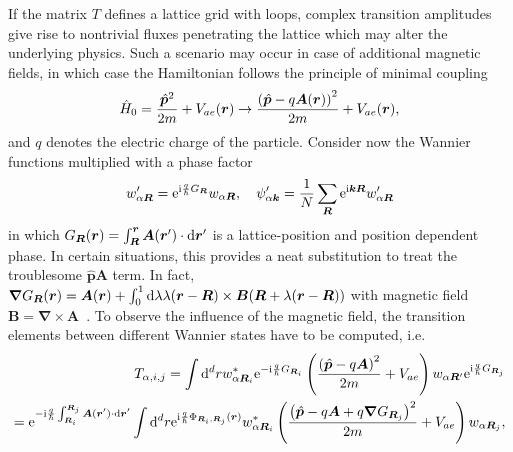 If the matrix $T$ defines a lattice grid with loops, complex transition amplitudes give rise to nontrivial fluxes penetrating the lattice which may alter the underlying physics.
Such a scenario may occur in case of additional magnetic fields, in which case the Hamiltonian follows the principle of minimal coupling
\begin{align}
    \hat H_0 = \frac{\hat{\bm p}^2}{2m}+V_{ae}(\bm r)\rightarrow \frac{\left( \hat{\bm p} - q\bm A(\bm r) \right)^2}{2m}+V_{ae}(\bm r),
\end{align}
and $q$ denotes the electric charge of the particle.
Consider now the Wannier functions multiplied with a phase factor
\begin{align}
    w'_{\alpha\bm R} = \mathrm e^{\mathrm i\frac q\hbar G_{\bm R}}w_{\alpha\bm R},
    \quad
    \psi'_{\alpha\bm k} = \frac1N\sum_{\bm R}\mathrm e^{\mathrm i\bm k\bm R}w'_{\alpha\bm R}
\end{align}
in which $G_{\bm R}(\bm r) = \int_{\bm R}^{\bm r}\bm A(\bm r')\cdot\mathrm d \bm r'$ is a lattice-position and position dependent phase.
In certain situations, this provides a neat substitution to treat the troublesome $\hat{\bm p}\bm A$ term.
In fact, $\bm\nabla G_{\bm R}(\bm r) = \bm A(\bm r) + \int_0^1\mathrm d\lambda\lambda (\bm r-\bm R)\times\bm B(\bm R+\lambda(\bm r-\bm R))$ with magnetic field $\bm B=\bm\nabla\times\bm A$~\cite{Luttinger1951}.
To observe the influence of the magnetic field, the transition elements between different Wannier states have to be computed, i.e.
\begin{align}
    T_{\alpha,i,j}
    =
    \int\mathrm d^d r
        w_{\alpha\bm R_i}^*
        \mathrm e^{-\mathrm i\frac q\hbar G_{\bm R_i}}
        \left( \frac{\left( \hat{\bm p}-q\bm A \right)^2}{2m}+V_{ae} \right)
        w_{\alpha \bm R'}
        \mathrm e^{\mathrm i\frac q\hbar G_{\bm R_j}}
    \\
    =
    \mathrm e^{-\mathrm i\frac q\hbar\int_{\bm R_i}^{\bm R_j}\bm A(\bm r')\cdot\mathrm d \bm r'}
    \int\mathrm d^d r
        \mathrm e^{\mathrm i\frac q\hbar\Phi_{\bm R_i,\bm R_j}(\bm r)}
        w_{\alpha\bm R_i}^*
        \left( \frac{\left( \hat{\bm p}-q\bm A+q\bm\nabla G_{\bm R_j} \right)^2}{2m}+V_{ae} \right)
        w_{\alpha \bm R_j},
    \label{eq:pre_peierls_approximation}
\end{align}
